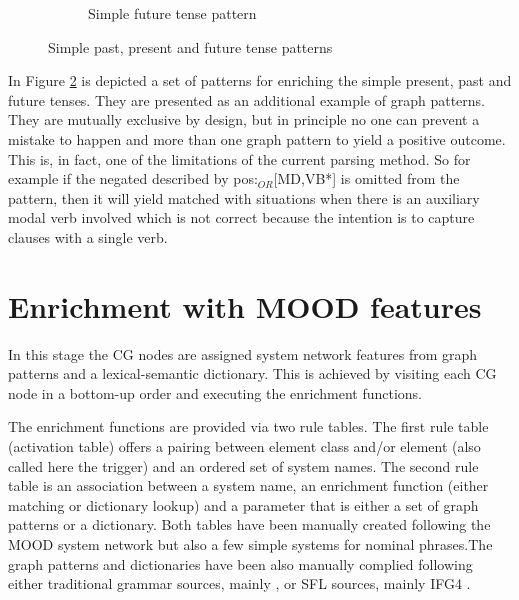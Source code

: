 \begin{figure}[!ht]
\begin{subfigure}[t]{0.47\textwidth}
            \caption{Simple future tense pattern}
            \label{fig:future-tense-pattern1}
        \end{subfigure}
        \caption{Simple past, present and future tense patterns}
        \label{fig:simple-tense-pattern1}
    \end{figure}

    In Figure \ref{fig:simple-tense-pattern1} is depicted a set of patterns for enriching the simple present, past and future tenses. They are presented as an additional example of graph patterns. They are mutually exclusive by design, but in principle no one can prevent a mistake to happen and more than one graph pattern to yield a positive outcome. This is, in fact, one of the limitations of the current parsing method. So for example if the negated described by pos:$_{OR}$[MD,VB*] is omitted from the pattern, then it will yield matched with situations when there is an auxiliary modal verb involved which is not correct because the intention is to capture clauses with a single verb. 

\section{Enrichment with MOOD features}
\label{sec:enrichment-stage}

In this stage the CG nodes are assigned system network features from graph patterns and a lexical-semantic dictionary. This is achieved by visiting each CG node in a bottom-up order and executing the enrichment functions. 

The enrichment functions are provided via two rule tables. The first rule table (activation table) offers a pairing between element class and/or element (also called here the trigger) and an ordered set of system names. The second rule table is an association between a system name, an enrichment function (either matching or dictionary lookup) and a parameter that is either a set of graph patterns or a dictionary. Both tables have been manually created following the MOOD system network but also a few simple systems for nominal phrases.The graph patterns and dictionaries have been also manually complied following either traditional grammar sources, mainly \citet{Quirk1985}, or SFL sources, mainly IFG4 \citep{Halliday2013}. 


